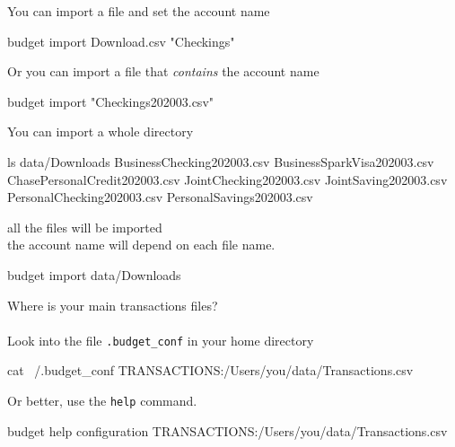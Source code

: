 \documentclass[12pt,letterpaper]{article}
\begin{document}
\begin{framed}
    \begin{minipage}[t][3in][t]{5in}
        \Large
        You can import a file and set the account name\\
        \begin{budget}
            budget import Download.csv "Checkings"
        \end{budget}
        Or you can import a file that \emph{contains} the account name\\
        \begin{budget}
            budget import "Checkings202003.csv"
        \end{budget}
    \end{minipage}
\end{framed}
\begin{framed}
    \begin{minipage}[t][3in][t]{5in}
        \Large
        You can import a whole directory \\
        \normalsize
        \begin{budget}
            ls data/Downloads 
            BusinessChecking202003.csv
            BusinessSparkVisa202003.csv
            ChasePersonalCredit202003.csv
            JointChecking202003.csv
            JointSaving202003.csv
            PersonalChecking202003.csv
            PersonalSavings202003.csv
        \end{budget}
        all the files will be imported\\
        the account name will depend on each file name. 
        \begin{budget}
            budget import data/Downloads
        \end{budget}
    \end{minipage}
\end{framed}
\begin{framed}
    \begin{minipage}[t][3in][t]{5in}
        \Large
        Where is your main transactions files?\\ \\
        Look into the file \lstinline[language=budget,basicstyle=\Large]!.budget_conf! in your home directory 
        \normalsize
        \begin{budget}
            cat ~/.budget_conf
            TRANSACTIONS:/Users/you/data/Transactions.csv
        \end{budget}
        \Large
        Or better, use the \lstinline[language=budget,basicstyle=\Large]!help! command.
        \begin{budget}
            budget help configuration 
            TRANSACTIONS:/Users/you/data/Transactions.csv
        \end{budget}
    \end{minipage}
\end{framed}
\end{document}

